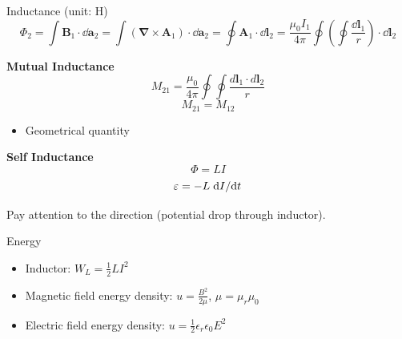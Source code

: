 \documentclass[9pt]{beamer}
\begin{document}
\begin{frame}{Inductance (unit: H)}
    \begin{equation*}
        \Phi_{2}=\int \mathbf{B}_{1} \cdot \dd \mathbf{a}_{2}=\int\left(\mathbf{\nabla} \times \mathbf{A}_{1}\right) \cdot \dd \mathbf{a}_{2}=\oint \mathbf{A}_{1} \cdot \dd \mathbf{l}_{2} =\frac{\mu_{0} I_{1}}{4 \pi} \oint\left(\oint \frac{\dd \mathbf{l}_{1}}{r}\right) \cdot \dd \mathbf{l}_{2}
    \end{equation*}
    \begin{beamerboxesrounded}[shadow=true]{\bf Mutual Inductance}
        \begin{equation}
            M_{21}=\frac{\mu_{0}}{4 \pi} \oint \oint \frac{d \mathbf{l}_{1} \cdot d \mathbf{l}_{2}}{r}
        \end{equation}
        \begin{equation}
            M_{21} = M_{12} 
        \end{equation}

        \begin{itemize}
            \item Geometrical quantity
        \end{itemize}
    \end{beamerboxesrounded}

    \begin{beamerboxesrounded}[shadow=true]{\bf Self Inductance}
        \begin{equation}
            \Phi = L I
        \end{equation}
        \begin{equation}
            \varepsilon = - L \dv*{I}{t} 
        \end{equation}

        Pay attention to the direction (potential drop through inductor).
    \end{beamerboxesrounded}
\end{frame}

\begin{frame}{Energy}
    \begin{itemize}
        \item Inductor: $W_L = \frac{1}{2} L I^2$
        \item Magnetic field energy density: $u = \frac{B^2}{2 \mu}$, $\mu=\mu_r\mu_0$
        \item Electric field energy density: $u=\frac{1}{2}\epsilon_r\epsilon_0E^2$
    \end{itemize}
\end{frame}
\end{document}
